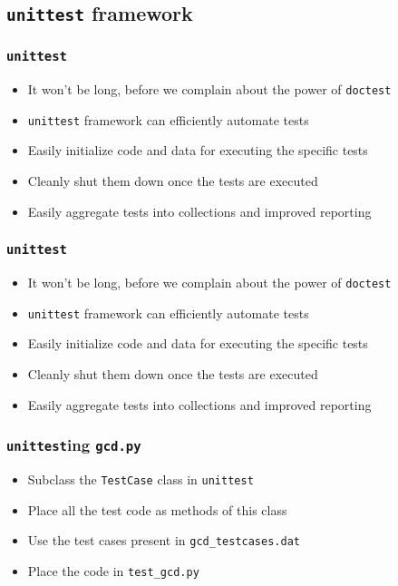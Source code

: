 \documentclass[12pt,presentation]{beamer}
\begin{document}
\subsection{\texttt{unittest} framework}

\begin{frame}[fragile]
  \frametitle{\texttt{unittest}}
  \begin{itemize}
  \item It won't be long, before we complain about the power of
    \texttt{doctest} 
  \item \texttt{unittest} framework can efficiently automate tests
  \item Easily initialize code and data for executing the specific
    tests
  \item Cleanly shut them down once the tests are executed
  \item Easily aggregate tests into collections and improved reporting
  \end{itemize}
\end{frame}


\begin{frame}[fragile]
  \frametitle{\texttt{unittest}}
  \begin{itemize}
  \item It won't be long, before we complain about the power of
    \texttt{doctest} 
  \item \texttt{unittest} framework can efficiently automate tests
  \item Easily initialize code and data for executing the specific
    tests
  \item Cleanly shut them down once the tests are executed
  \item Easily aggregate tests into collections and improved reporting
  \end{itemize}
\end{frame}

\begin{frame}[fragile]
  \frametitle{\texttt{unittest}ing \texttt{gcd.py}}
  \begin{itemize}
  \item Subclass the \texttt{TestCase} class in \texttt{unittest}
  \item Place all the test code as methods of this class
  \item Use the test cases present in \texttt{gcd\_testcases.dat}
  \item Place the code in \texttt{test\_gcd.py} 
  \end{itemize}
\end{frame}
\end{document}
